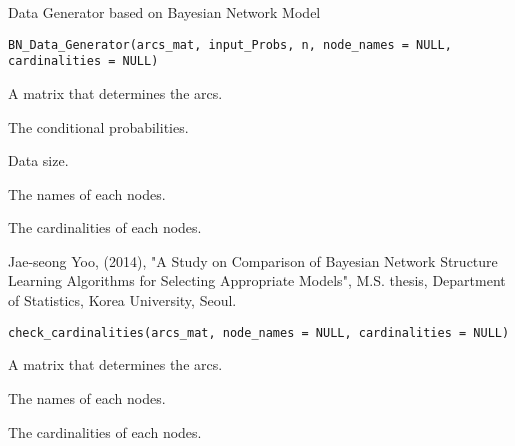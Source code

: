 \documentclass[letterpaper]{book}
\begin{document}
%
\begin{Description}\relax
Data Generator based on Bayesian Network Model
\end{Description}
%
\begin{Usage}
\begin{verbatim}
BN_Data_Generator(arcs_mat, input_Probs, n, node_names = NULL, cardinalities = NULL)
\end{verbatim}
\end{Usage}
%
\begin{Arguments}
\begin{ldescription}
\item[\code{arcs\_mat}]  A matrix that determines the arcs.

\item[\code{input\_Probs}]  The conditional probabilities. 
\item[\code{n}]  Data size. 
\item[\code{node\_names}]  The names of each nodes. 
\item[\code{cardinalities}]  The cardinalities of each nodes. 
\end{ldescription}
\end{Arguments}
%
\begin{References}\relax
Jae-seong Yoo, (2014), "A Study on Comparison of Bayesian Network Structure Learning Algorithms for Selecting Appropriate Models", M.S. thesis, Department of Statistics, Korea University, Seoul.
\end{References}
%
\begin{Usage}
\begin{verbatim}
check_cardinalities(arcs_mat, node_names = NULL, cardinalities = NULL)
\end{verbatim}
\end{Usage}
%
\begin{Arguments}
\begin{ldescription}
\item[\code{arcs\_mat}]  A matrix that determines the arcs. 
\item[\code{node\_names}]  The names of each nodes. 
\item[\code{cardinalities}]  The cardinalities of each nodes. 
\end{ldescription}
\end{Arguments}
\end{document}
